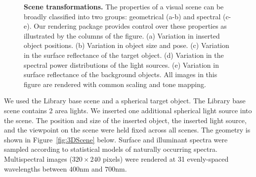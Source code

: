 \documentclass{jov}
\begin{document}
\begin{figure}
    \caption{{\bf Scene transformations.} The properties of a visual scene can be broadly classified into two groups: geometrical (a-b) and spectral (c-e). Our rendering package provides control over these properties as illustrated by the columns of the figure. (a) Variation in inserted object positions. (b) Variation in object size and pose. (c) Variation in the surface reflectance of the target object. (d) Variation in the spectral power distributions of the light sources. (e) Variation in surface reflectance of the background objects. All images in this figure are rendered with common scaling and tone mapping.
\label{fig:VWCCTransformations}}
\end{figure}

We used the Library base scene and a spherical target object.
The Library base scene contains 2 area lights. 
We inserted one additional spherical light source into the scene.
The position and size of the inserted object, the inserted light source, and the viewpoint on the scene were held fixed across all 
scenes. The geometry is shown in Figure~\ref{fig:3DScene} below.
Surface and illuminant spectra were sampled according to statistical models of naturally occurring spectra.
Multispectral images ($320 \times 240$ pixels) were rendered at 31 evenly-spaced wavelengths between $400$nm and $700$nm.
\end{document}
